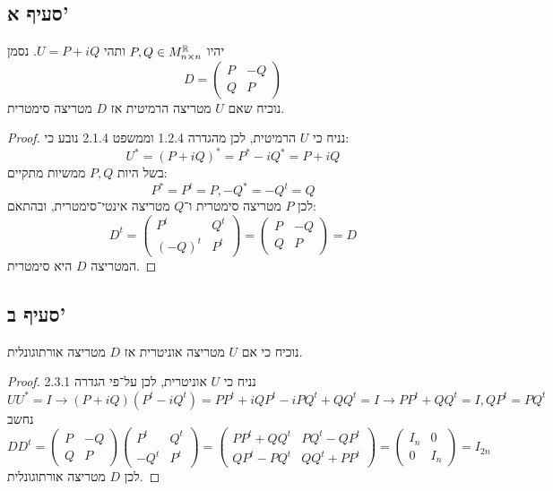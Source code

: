 \subsection{סעיף א'}
יהיו $P, Q \in M^{\mathbb{R}}_{n \times n}$ ותהי $U = P + iQ$. נסמן
\[
	D = \begin{pmatrix}
		P & -Q \\
		Q & P
	\end{pmatrix}
\]
נוכיח שאם $U$ מטריצה הרמיטית אז $D$ מטריצה סימטרית.
\begin{proof}
	נניח כי $U$ הרמיטית, לכן מהגדרה 1.2.4 וממשפט 2.1.4 נובע כי:
	\[
		U^* = {(P + iQ)}^* = P^* - i Q^* = P + i Q
	\]
	בשל היות $P, Q$ ממשיות מתקיים:
	\[
		P^* = P^t = P, -Q^* = -Q^t = Q
	\]
	לכן $P$ מטריצה סימטרית ו־$Q$ מטריצה אינטי־סימטרית, ובהתאם:
	\[
		D^t = \begin{pmatrix}
			P^t & Q^t \\
			{(-Q)}^t & P^t
		\end{pmatrix}
		= \begin{pmatrix}
			P & -Q \\
			Q & P
		\end{pmatrix}
		= D
	\]
	המטריצה $D$ היא סימטרית.
\end{proof}

\subsection{סעיף ב'}
נוכיח כי אם $U$ מטריצה אוניטרית אז $D$ מטריצה אורתוגונלית.
\begin{proof}
	נניח כי $U$ אוניטרית, לכן על־פי הגדרה 2.3.1
	\[
		U U^* = I \rightarrow (P + i Q)(P^t - i Q^t) = P P^t + i Q P^t - i P Q^t + Q Q^t = I \rightarrow PP^t + QQ^t = I, QP^t = PQ^t
	\]
	נחשב
	\[
		D D^t
		= \begin{pmatrix}
			P & -Q \\
			Q & P
		\end{pmatrix} \begin{pmatrix}
			P^t & Q^t \\
			-Q^t & P^t
		\end{pmatrix}
		= \begin{pmatrix}
			PP^t + QQ^t & PQ^t - QP^t \\
			QP^t - PQ^t & QQ^t + PP^t
		\end{pmatrix}
		= \begin{pmatrix}
			I_n & 0 \\
			0 & I_n
		\end{pmatrix}
		= I_{2n}
	\]
	לכן $D$ מטריצה אורתוגונלית.
\end{proof}

